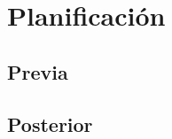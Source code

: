 \cleardoublepage
\clearpage{}

\chapter[Planificación]{Planificación}
\section{Previa}
\section{Posterior}
